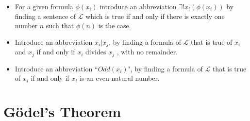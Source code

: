\documentclass[justified]{tufte-handout}
\begin{document}
\begin{itemize}
\begin{itemize}
\item For a given formula $\phi(x_i)$ introduce an abbreviation $\exists ! x_i (\phi(x_i))$ by finding a sentence of $\mathcal{L }$ which is true if and only if there is exactly one number $n$ such
that $\phi(n)$ is the case.


\item Introduce an abbreviation $x_i|x_j$, by finding a formula of $\mathcal{L}$ that is true of $x_i$ and $x_j$ if and only if $x_i$ divides $x_j$ , with no remainder.


\item Introduce an abbreviation ``$Odd(x_i)$", by finding a formula of $\mathcal{L}$ that is true of $x_i$ if and only if $x_i$ is an even natural number.


\end{itemize}



\end{itemize}



\section{G\"{o}del's Theorem}
\end{document}

